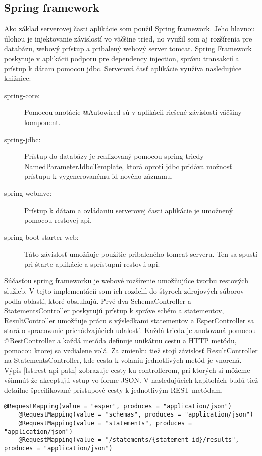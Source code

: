 	\subsection{Spring framework}
		Ako základ serverovej časti aplikácie som použil Spring framework. Jeho hlavnou úlohou je injektovanie závislostí vo väčšine tried, no využil som aj rozšírenia pre databázu, webový prístup a pribalený webový server tomcat.
		Spring Framework poskytuje v aplikácii podporu pre dependency injection, správu transakcií a prístup k dátam pomocou jdbc. Serverová časť aplikácie využíva nasledujúce knižnice:
		\begin{description}
			\item[spring-core:] Pomocou anotácie @Autowired sú v aplikácii riešené závislosti väčšiny komponent.
			\item[spring-jdbc:] Prístup do databázy je realizovaný pomocou spring triedy NamedParameterJdbcTemplate, ktorá oproti jdbc pridáva možnosť prístupu k vygenerovanému id nového záznamu.
			\item[spring-webmvc:] Prístup k dátam a ovládaniu serverovej časti aplikácie je umožnený pomocou restovej api.
			\item[spring-boot-starter-web:] Táto závislosť umožňuje použitie pribaleného tomcat serveru. Ten sa spustí pri štarte aplikácie a sprístupní restovú api.
		\end{description}
		
		Súčasťou spring frameworku je webové rozšírenie umožňujúce tvorbu restových služieb. V tejto implementácii som ich rozdelil do štyroch zdrojových súborov podľa oblastí, ktoré obsluhujú. Prvé dva SchemaController a StatementsController poskytujú prístup k správe schém a statementov, ResultController umožňuje prácu s výsledkami statementov a EsperController sa stará o spracovanie prichádzajúcich udalostí. Každá trieda je anotovaná pomocou @RestController a každá metóda definuje unikátnu cestu a HTTP metódu, pomocou ktorej sa vzdialene volá. Za zmienku tiež stojí závislosť ResultController na StatementsController, kde cesta k volaniu jednotlivých metód je vnorená. Výpis \ref{lst:rest-api-path} zobrazuje cesty ku controllerom, pri ktorých si môžeme všimnúť že akceptujú vstup vo forme JSON. V nasledujúcich kapitolách budú tiež detailne špecifikované prístupové cesty k jednotlivým REST metódam. 
		
		\begin{lstlisting}[label=lst:rest-api-path,caption=Definícia ciest REST API]
	@RequestMapping(value = "esper", produces = "application/json")
	@RequestMapping(value = "schemas", produces = "application/json")
	@RequestMapping(value = "statements", produces = "application/json")
	@RequestMapping(value = "/statements/{statement_id}/results", produces = "application/json")
		\end{lstlisting}
		
